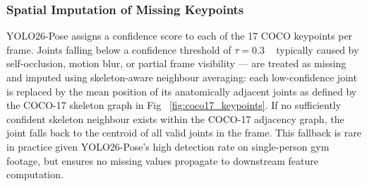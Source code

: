 \documentclass[conference,onecolumn,oneside]{IEEEtran}
\begin{document}
\subsubsection{Spatial Imputation of Missing Keypoints}
\vspace{0.5cm}
YOLO26-Pose assigns a confidence score to each of the 17 COCO keypoints
per frame. Joints falling below a confidence threshold of $\tau = 0.3$ ~\cite{purkrabek2025probpose}
typically caused by self-occlusion, motion blur, or partial frame
visibility --- are treated as missing and imputed using skeleton-aware
neighbour averaging: each low-confidence joint is replaced by the mean
position of its anatomically adjacent joints as defined by the COCO-17
skeleton graph in Fig ~\ref{fig:coco17_keypoints}. If no sufficiently confident skeleton neighbour exists within the COCO-17
adjacency graph, the joint falls back to the centroid of all valid joints
in the frame. This fallback is rare in practice given YOLO26-Pose's high
detection rate on single-person gym footage, but ensures no missing values
propagate to downstream feature computation.

\vspace{0.5cm}
\end{document}
